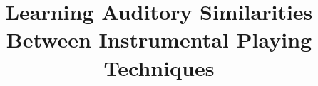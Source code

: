\documentclass{bmcart}
\begin{document}
\begin{frontmatter}

\begin{fmbox}


\title{Learning Auditory Similarities Between Instrumental Playing Techniques}


\author[
   addressref={aff1},                   %
   email={vincent.lostanlen@nyu.edu}            %
]{ }
\author[
   addressref={aff2},
   email={christian.elhajj@ls2n.fr}
]{ }
\author[
   addressref={aff3},
   email={mathias.rossignol@lonofi.com}
]{ }
\author[
   addressref={aff3},
   email={gregoire.lafay@lonofi.com}
]{ }
\author[
   addressref={ccm},
   email={janden@flatironinstitute.org}
]{ }
\author[
  corref={aff2},
  addressref={aff2},
  email={mathieu.lagrange@ls2n.fr}
]{ }



\end{fmbox}
\end{frontmatter}
\end{document}

